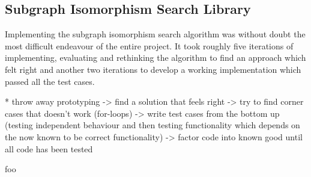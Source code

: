 
\subsection{Subgraph Isomorphism Search Library}
\label{sec:impl_subgraph_isomorphism_search_library}

Implementing the subgraph isomorphism search algorithm was without doubt the most difficult endeavour of the entire project. It took roughly five iterations of implementing, evaluating and rethinking the algorithm to find an approach which felt right and another two iterations to develop a working implementation which passed all the test cases.

* throw away prototyping -> find a solution that feels right -> try to find corner cases that doesn't work (for-loops) -> write test cases from the bottom up (testing independent behaviour and then testing functionality which depends on the now known to be correct functionality) -> factor code into known good until all code has been tested

foo

%




